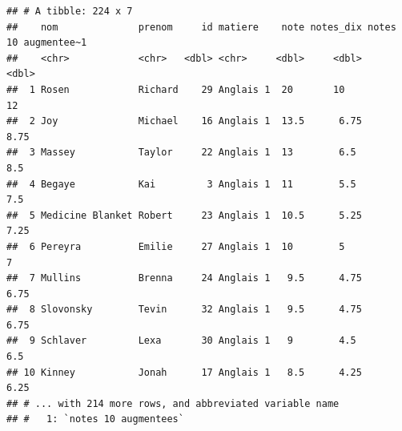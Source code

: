 \documentclass[
  11pt,
]{book}
\numberwithin{equation}{section}
\numberwithin{countremarque}{section}
\begin{document}
\begin{lstlisting}
## # A tibble: 224 x 7
##    nom              prenom     id matiere    note notes_dix notes 10 augmentee~1
##    <chr>            <chr>   <dbl> <chr>     <dbl>     <dbl>                <dbl>
##  1 Rosen            Richard    29 Anglais 1  20       10                   12   
##  2 Joy              Michael    16 Anglais 1  13.5      6.75                 8.75
##  3 Massey           Taylor     22 Anglais 1  13        6.5                  8.5 
##  4 Begaye           Kai         3 Anglais 1  11        5.5                  7.5 
##  5 Medicine Blanket Robert     23 Anglais 1  10.5      5.25                 7.25
##  6 Pereyra          Emilie     27 Anglais 1  10        5                    7   
##  7 Mullins          Brenna     24 Anglais 1   9.5      4.75                 6.75
##  8 Slovonsky        Tevin      32 Anglais 1   9.5      4.75                 6.75
##  9 Schlaver         Lexa       30 Anglais 1   9        4.5                  6.5 
## 10 Kinney           Jonah      17 Anglais 1   8.5      4.25                 6.25
## # ... with 214 more rows, and abbreviated variable name
## #   1: `notes 10 augmentees`
\end{lstlisting}
\end{document}
